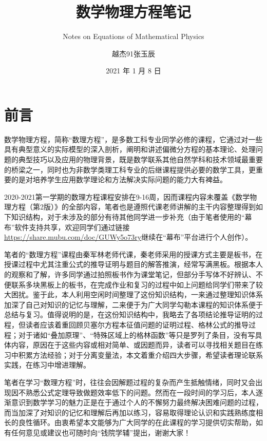 \documentclass[
  10pt,
  twoside,
  openany,
  b5paper, %
  colorscheme = basic, %
]{qyxf-book}
\title{数学物理方程笔记}
\subtitle{Notes on Equations of Mathematical Physics}  %
\author{越杰91张玉辰}
\date{2021 年 1 月 8 日}
\begin{document}
\maketitle

\chapter*{前言}
\thispagestyle{empty}

数学物理方程，简称“数理方程”，是多数工科专业同学必修的课程，它通过对一些具有典型意义的实际模型的深入剖析，阐明和讲述偏微分方程的基本理论、处理问题的典型技巧以及应用的物理背景，既是数学联系其他自然学科和技术领域最重要的桥梁之一，同时也为非数学类理工科专业的后继课程提供必要的数学工具，更重要的是对培养学生应用数学理论和方法解决实际问题的能力大有裨益。

2020-2021第一学期的数理方程课程安排在9-16周，因而课程内容未覆盖《数学物理方程（第2版）》的全部内容，笔者也是遵照代课老师讲解的主干内容整理得到如下知识结构，对于未涉及的部分有待其他同学进一步补充（由于笔者使用的“幕布”软件支持共享，欢迎同学们通过链接\url{https://share.mubu.com/doc/GUWy5o73ry}继续在“幕布”平台进行个人创作）。

笔者的“数理方程”课程由秦军林老师代课，秦老师采用的授课方式主要是板书，在授课过程中尤其注重公式的推导证明与题目的解答推演，经常写满黑板。根据本人的观察和了解，许多同学通过拍照板书作为课堂笔记，但部分手写体不好辨认、不便联系多块黑板上的板书，在完成作业和复习的过程中如上问题给同学们带来了较大困扰。鉴于此，本人利用空闲时间整理了这份知识结构，一来通过整理知识体系加深了自己对知识的记忆与理解，二来便于为广大同学勾勒本课程的知识体系便于总结与复习。值得说明的是，在这份知识结构中，我略去了各项结论推导证明的过程，但读者应该着重回顾贝塞尔方程本征值问题的证明过程、格林公式的推导过程；对于诸如“叠加原理”、“特殊区域上的格林函数”等只是罗列了条目，没有写具体内容，原因在于这些内容或相对简单、或因题而异，读者可以寻找相关题目在练习中积累方法经验；对于分离变量法，本文着重介绍四大步骤，希望读者理论联系实践，在练习中增进理解。

笔者在学习“数理方程”时，往往会因解题过程的复杂而产生抵触情绪，同时又会出现因不熟悉公式定理导致做题效率低下的问题。然而在一段时间的学习后，本人逐渐意识到数学学习的魅力正是在于通过个人的不懈努力最终解决困难问题的过程，而当加深了对知识的记忆和理解后再加以练习，容易取得理论认识和实践熟练度相长的良性循环。由衷希望本文能够为广大同学的在此课程的学习提供切实帮助，如有任何意见或建议也可随时向“钱院学辅”提出，谢谢大家！


\newpage
\setcounter{page}{1}




\end{document}
